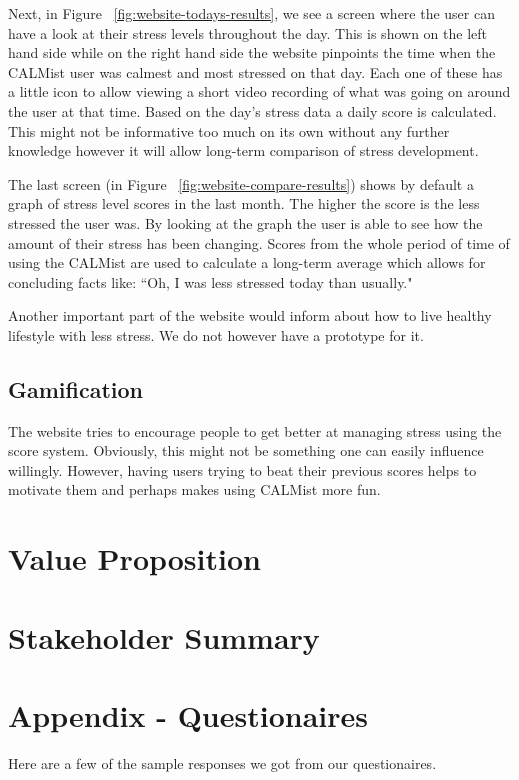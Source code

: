 \documentclass{scrartcl}
\begin{document}
Next, in Figure ~\ref{fig:website-todays-results}, we see a screen where the user can have a look at their stress levels throughout the day. This is shown on the left hand side while on the right hand side the website pinpoints the time when the CALMist user was calmest and most stressed on that day. Each one of these has a little icon to allow viewing a short video recording of what was going on around the user at that time. Based on the day's stress data a daily score is calculated. This might not be informative too much on its own without any further knowledge however it will allow long-term comparison of stress development.

The last screen (in Figure ~\ref{fig:website-compare-results}) shows by default a graph of stress level scores in the last month. The higher the score is the less stressed the user was. By looking at the graph the user is able to see how the amount of their stress has been changing. Scores from the whole period of time of using the CALMist are used to calculate a long-term average which allows for concluding facts like: ``Oh, I was less stressed today than usually."

Another important part of the website would inform about how to live healthy lifestyle with less stress. We do not however have a prototype for it.

\subsection{Gamification}

The website tries to encourage people to get better at managing stress using the score system. Obviously, this might not be something one can easily influence willingly. However, having users trying to beat their previous scores helps to motivate them and perhaps makes using CALMist more fun.

\section{Value Proposition}

\section{Stakeholder Summary}

\section{Appendix - Questionaires}
Here are a few of the sample responses we got from our questionaires.






\end{document}
